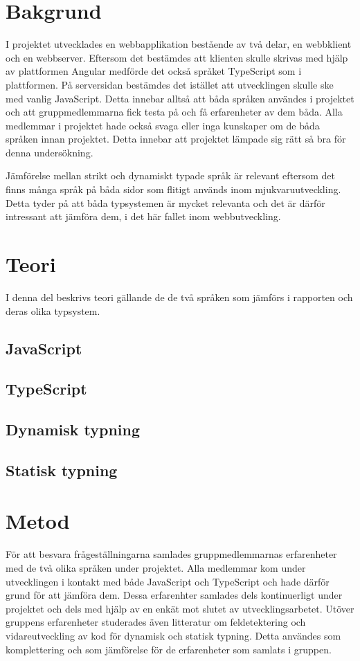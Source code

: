 \section{Bakgrund}
I projektet utvecklades en webbapplikation bestående av två delar, en webbklient och en webbserver. Eftersom det bestämdes att klienten skulle skrivas med hjälp av plattformen Angular medförde det också språket TypeScript som i plattformen. På serversidan bestämdes det istället att utvecklingen skulle ske med vanlig JavaScript. Detta innebar alltså att båda språken användes i projektet och att gruppmedlemmarna fick testa på och få erfarenheter av dem båda. Alla medlemmar i projektet hade också svaga eller inga kunskaper om de båda språken innan projektet. Detta innebar att projektet lämpade sig rätt så bra för denna undersökning.

Jämförelse mellan strikt och dynamiskt typade språk är relevant eftersom det finns många språk på båda sidor som flitigt används inom mjukvaruutveckling. Detta tyder på att båda typsystemen är mycket relevanta och det är därför intressant att jämföra dem, i det här fallet inom webbutveckling.
\section{Teori}
I denna del beskrivs teori gällande de de två språken som jämförs i rapporten och deras olika typsystem.
\subsection{JavaScript}
\subsection{TypeScript}
\subsection{Dynamisk typning}
\subsection{Statisk typning}
\section{Metod}
För att besvara frågeställningarna samlades gruppmedlemmarnas erfarenheter med de två olika språken under projektet. Alla medlemmar kom under utvecklingen i kontakt med både JavaScript och TypeScript och hade därför grund för att jämföra dem. Dessa erfarenhter samlades dels kontinuerligt under projektet och dels med hjälp av en enkät mot slutet av utvecklingsarbetet. Utöver gruppens erfarenheter studerades även litteratur om feldetektering och vidareutveckling av kod för dynamisk och statisk typning. Detta användes som komplettering och som jämförelse för de erfarenheter som samlats i gruppen.
